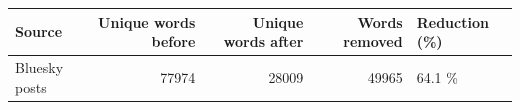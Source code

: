 \begin{tabular}{lrrrl}
\toprule
Source & Unique words before & Unique words after & Words removed & Reduction (\%) \\
\midrule
Bluesky posts & 77974 & 28009 & 49965 & 64.1 \% \\
\bottomrule
\end{tabular}
